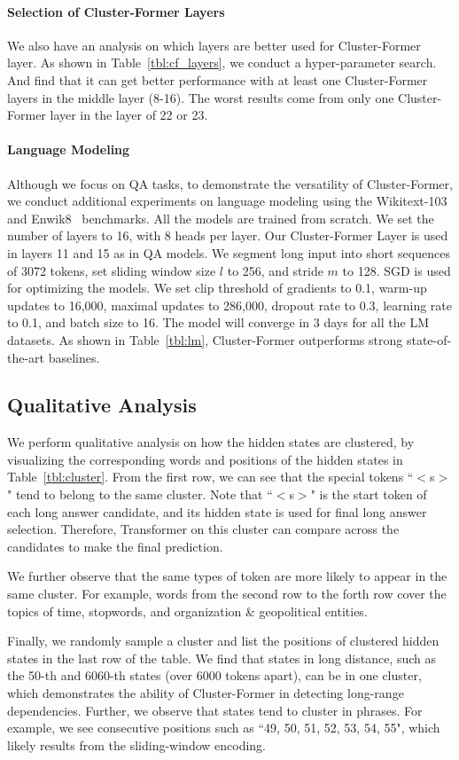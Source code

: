 \paragraph{Selection of Cluster-Former Layers}
We also have an analysis on which layers are better used for Cluster-Former layer. As shown in Table~\ref{tbl:cf_layers}, we conduct a hyper-parameter search. And find that it can get better performance with at least one Cluster-Former layers in the middle layer (8-16). The worst results come from only one Cluster-Former layer in the layer of 22 or 23. 



\paragraph{Language Modeling}
Although we focus on QA tasks, to demonstrate the versatility of Cluster-Former, we conduct additional experiments on language modeling using the Wikitext-103~\citep{merity2016pointer} and Enwik8~\citep{mahoney2011large} benchmarks. 
All the models are trained from scratch.
We set the number of layers to 16, with 8 heads per layer.
Our Cluster-Former Layer is used in layers 11 and 15 as in QA models. 
We segment long input into short sequences of 3072 tokens, set sliding window size $l$ to 256, and stride $m$ to 128.
SGD is used for optimizing the models.
We set clip threshold of gradients to 0.1, warm-up updates to 16,000, maximal updates to 286,000, dropout rate to 0.3, learning rate to 0.1, and batch size to 16.
The model will converge in 3 days for all the LM datasets.
As shown in Table~\ref{tbl:lm}, Cluster-Former outperforms strong state-of-the-art baselines.


\subsection{Qualitative Analysis}

We perform qualitative analysis on how the hidden states are clustered,
by visualizing the corresponding words and positions of the hidden states in Table~\ref{tbl:cluster}.
From the first row, we can see that the special tokens ``$<$s$>$" tend to belong to the same cluster. 
Note that ``$<$s$>$" is the start token of each long answer candidate, and its hidden state is used for final long answer selection.
Therefore, Transformer on this cluster can compare across the candidates to make the final prediction.

We further observe that the same types of token are more likely to appear in the same cluster. 
For example, words from the second row to the forth row cover the topics of time, stopwords, and organization \& geopolitical entities.

Finally, we randomly sample a cluster and list the positions of clustered hidden states in the last row of the table. 
We find that states in long distance, such as the 50-th and 6060-th states (over 6000 tokens apart), can be in one cluster, which demonstrates the ability of Cluster-Former in detecting long-range dependencies. Further, we observe that states tend to cluster in phrases. 
For example, we see consecutive positions such as ``49, 50, 51, 52, 53, 54, 55", which likely results from the sliding-window encoding.

